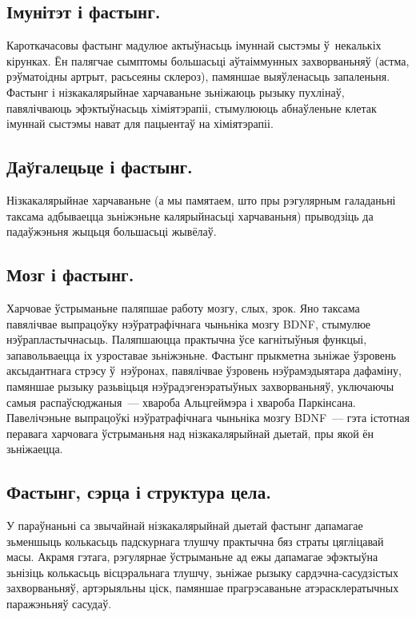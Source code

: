 \subsection{Імунітэт і фастынг.}
Кароткачасовы фастынг мадулюе актыўнасьць імуннай сыстэмы ў~некалькіх кірунках. Ён палягчае сымптомы большасьці аўтаіммунных захворваньняў (астма, рэўматоідны артрыт, расьсеяны склероз), памяншае выяўленасьць запаленьня. Фастынг і нізкакалярыйнае харчаваньне зьніжаюць рызыку пухлінаў, павялічваюць эфэктыўнасьць хіміятэрапіі, стымулююць абнаўленьне клетак імуннай сыстэмы нават для пацыентаў на хіміятэрапіі.

\subsection{Даўгалецьце і фастынг.}
Нізкакалярыйнае харчаваньне (а мы памятаем, што пры рэгулярным галаданьні таксама адбываецца зьніжэньне калярыйнасьці харчаваньня) прыводзіць да падаўжэньня жыцьця большасьці жывёлаў.

\subsection{Мозг і фастынг.}
Харчовае ўстрыманьне паляпшае работу мозгу, слых, зрок. Яно таксама павялічвае выпрацоўку нэўратрафічнага чыньніка мозгу BDNF, стымулюе нэўрапластычнасьць. Паляпшаюцца практычна ўсе кагнітыўныя функцыі, запавольваецца іх узроставае зьніжэньне. Фастынг прыкметна зьніжае ўзровень аксыдантнага стрэсу ў~нэўронах, павялічвае ўзровень нэўрамэдыятара дафаміну, памяншае рызыку разьвіцьця нэўрадэгенэратыўных захворваньняў, уключаючы самыя распаўсюджаныя~--- хвароба Альцгеймэра і хвароба Паркінсана. Павелічэньне выпрацоўкі нэўратрафічнага чыньніка мозгу BDNF~--- гэта істотная перавага харчовага ўстрыманьня над нізкакалярыйнай дыетай, пры якой ён зьніжаецца.


\subsection{Фастынг, сэрца і структура цела.}
У параўнаньні са звычайнай нізкакалярыйнай дыетай фастынг дапамагае зьменшыць колькасьць падскурнага тлушчу практычна бяз страты цягліцавай масы. Акрамя гэтага, рэгулярнае ўстрыманьне ад ежы дапамагае эфэктыўна зьнізіць колькасьць вісцэральнага тлушчу, зьніжае рызыку сардэчна-сасудзістых захворваньняў, артэрыяльны ціск, памяншае прагрэсаваньне атэрасклератычных паражэньняў сасудаў.

